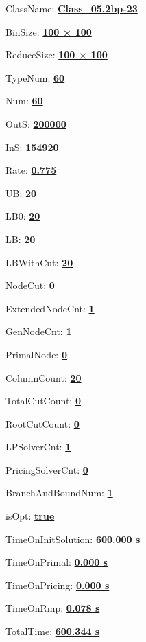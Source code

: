 \documentclass[11pt]{article}
\begin{document}
\pagestyle{empty}


ClassName: \underline{\textbf{Class_05.2bp-23}}
\par
BinSize: \underline{\textbf{100 × 100}}
\par
ReduceSize: \underline{\textbf{100 × 100}}
\par
TypeNum: \underline{\textbf{60}}
\par
Num: \underline{\textbf{60}}
\par
OutS: \underline{\textbf{200000}}
\par
InS: \underline{\textbf{154920}}
\par
Rate: \underline{\textbf{0.775}}
\par
UB: \underline{\textbf{20}}
\par
LB0: \underline{\textbf{20}}
\par
LB: \underline{\textbf{20}}
\par
LBWithCut: \underline{\textbf{20}}
\par
NodeCut: \underline{\textbf{0}}
\par
ExtendedNodeCnt: \underline{\textbf{1}}
\par
GenNodeCnt: \underline{\textbf{1}}
\par
PrimalNode: \underline{\textbf{0}}
\par
ColumnCount: \underline{\textbf{20}}
\par
TotalCutCount: \underline{\textbf{0}}
\par
RootCutCount: \underline{\textbf{0}}
\par
LPSolverCnt: \underline{\textbf{1}}
\par
PricingSolverCnt: \underline{\textbf{0}}
\par
BranchAndBoundNum: \underline{\textbf{1}}
\par
isOpt: \underline{\textbf{true}}
\par
TimeOnInitSolution: \underline{\textbf{600.000 s}}
\par
TimeOnPrimal: \underline{\textbf{0.000 s}}
\par
TimeOnPricing: \underline{\textbf{0.000 s}}
\par
TimeOnRmp: \underline{\textbf{0.078 s}}
\par
TotalTime: \underline{\textbf{600.344 s}}
\par
\newpage


\end{document}
